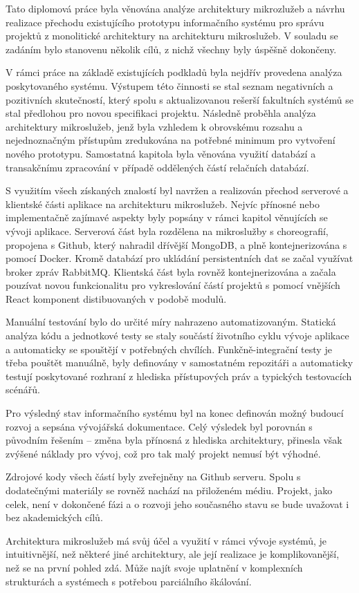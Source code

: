 Tato diplomová práce byla věnována analýze architektury mikrozlužeb a návrhu realizace přechodu existujícího prototypu informačního systému pro správu projektů z monolitické architektury na architekturu mikroslužeb.
V souladu se zadáním bylo stanovenu několik cílů, z nichž všechny byly úspěšně dokončeny.

V rámci práce na základě existujících podkladů byla nejdřív provedena analýza poskytovaného systému.
Výstupem této činnosti se stal seznam negativních a pozitivních skutečností, který spolu s aktualizovanou rešerší fakultních systémů se stal předlohou pro novou specifikaci projektu.
Následně proběhla analýza architektury mikroslužeb, jenž byla vzhledem k obrovskému rozsahu a nejednoznačným přístupům zredukována na potřebné minimum pro vytvoření nového prototypu.
Samostatná kapitola byla věnována využití databází a transakčnímu zpracování v případě oddělených částí relačních databází.

S využitím všech získaných znalostí byl navržen a realizován přechod serverové a klientské části aplikace na architekturu mikroslužeb.
Nejvíc přínosné nebo implementačně zajímavé aspekty byly popsány v rámci kapitol věnujících se vývoji aplikace.
Serverová část byla rozdělena na mikroslužby s choreografií, propojena s Github, který nahradil dřívější MongoDB, a plně kontejnerizována s pomocí Docker.
Kromě databází pro ukládání persistentních dat se začal využívat broker zpráv RabbitMQ\@.
Klientská část byla rovněž kontejnerizována a začala pouzívat novou funkcionalitu pro vykreslování částí projektů s pomocí vnějších React komponent distibuovaných v podobě  modulů.

Manuální testování bylo do určité míry nahrazeno automatizovaným.
Statická analýza kódu a jednotkové testy se staly součástí životního cyklu vývoje aplikace a automaticky se spouštějí v potřebných chvílích.
Funkčně-integrační testy je třeba pouštět manuálně, byly definovány v samostatném repozitáři a automaticky testují poskytované rozhraní z hlediska přístupových práv a typických testovacích scénářů.

Pro výsledný stav informačního systému byl na konec definován možný budoucí rozvoj a sepsána vývojářská dokumentace.
Celý výsledek byl porovnán s původním řešením – změna byla přínosná z hlediska architektury, přinesla však zvýšené náklady pro vývoj, což pro tak malý projekt nemusí být výhodné.

Zdrojové kody všech částí  byly zveřejněny na Github serveru.
Spolu s dodatečnými materiály se rovněž nachází na přiloženém médiu.
Projekt, jako celek, není v dokončené fázi a o rozvoji jeho současného stavu se bude uvažovat i bez akademických cílů.

Architektura mikroslužeb má svůj účel a využití v rámci vývoje systémů, je intuitivnější, než některé jiné architektury, ale její realizace je komplikovanější, než se na první pohled zdá.
Může najít svoje uplatnění v komplexních strukturách a systémech s potřebou parciálního škálování.
